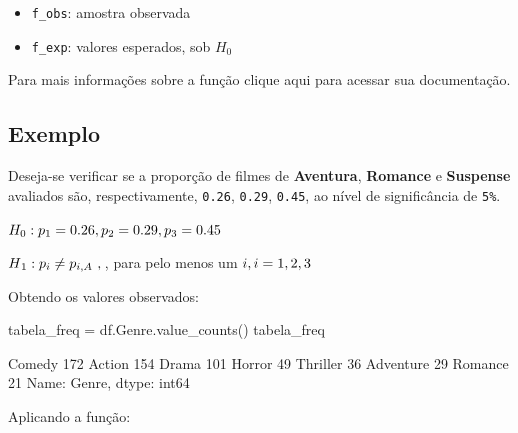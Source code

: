 \documentclass[
  letterpaper,
  DIV=11,
  numbers=noendperiod]{scrreprt}
\newenvironment{Shaded}{\begin{snugshade}}{\end{snugshade}}
\newcommand{\NormalTok}[1]{\textcolor[rgb]{0.00,0.23,0.31}{#1}}
\newcommand{\OperatorTok}[1]{\textcolor[rgb]{0.37,0.37,0.37}{#1}}
\providecommand{\tightlist}{%
  \setlength{\itemsep}{0pt}\setlength{\parskip}{0pt}}\usepackage{longtable,booktabs,array}
\begin{document}
\begin{itemize}
\tightlist
\item
  \texttt{f\_obs}: amostra observada
\item
  \texttt{f\_exp}: valores esperados, sob \(H_{0}\)
\end{itemize}

Para mais informações sobre a função clique aqui para acessar sua
documentação.

\hypertarget{exemplo-7}{%
\subsection{Exemplo}\label{exemplo-7}}

Deseja-se verificar se a proporção de filmes de \textbf{Aventura},
\textbf{Romance} e \textbf{Suspense} avaliados são, respectivamente,
\texttt{0.26}, \texttt{0.29}, \texttt{0.45}, ao nível de significância
de \texttt{5\%}.

\(H_{0} : p_{1} = 0.26 \\ , \\ p_{2} = 0.29 \\ , \\ p_{3} = 0.45\)

\(H\\_{1} : p\\_{i} \neq p\\_{i,A}  , \\\), para pelo menos um
\(i \\ , \\ i = 1, 2, 3\)

Obtendo os valores observados:

\begin{Shaded}
\begin{Highlighting}[]
\NormalTok{tabela\_freq }\OperatorTok{=}\NormalTok{ df.Genre.value\_counts()}
\NormalTok{tabela\_freq}
\end{Highlighting}
\end{Shaded}

\begin{tcolorbox}[enhanced jigsaw, breakable, leftrule=.75mm, left=2mm, opacityback=0, bottomrule=.15mm, toprule=.15mm, rightrule=.15mm, arc=.35mm, colback=white]

Comedy 172 Action 154 Drama 101 Horror 49 Thriller 36 Adventure 29
Romance 21 Name: Genre, dtype: int64

\end{tcolorbox}

Aplicando a função:
\end{document}
